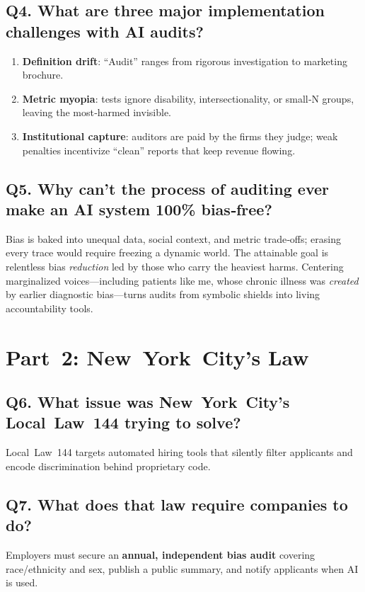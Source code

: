 \documentclass[12pt,twoside]{article}
\begin{document}
\subsection*{\textbf{Q4.} What are three major implementation challenges with AI audits?}
\begin{enumerate}[noitemsep]
\item \textbf{Definition drift}: “Audit” ranges from rigorous investigation to marketing brochure.%
\item \textbf{Metric myopia}: tests ignore disability, intersectionality, or small‑N groups, leaving the most‑harmed invisible.%
\item \textbf{Institutional capture}: auditors are paid by the firms they judge; weak penalties incentivize ``clean'' reports that keep revenue flowing.%
\end{enumerate}

\subsection*{\textbf{Q5.} Why can’t the process of auditing ever make an AI system 100\% bias‑free?}
Bias is baked into unequal data, social context, and metric trade‑offs; erasing every trace would require freezing a dynamic world. The attainable goal is relentless bias \textit{reduction} led by those who carry the heaviest harms. Centering marginalized voices—including patients like me, whose chronic illness was \emph{created} by earlier diagnostic bias—turns audits from symbolic shields into living accountability tools.

\section{Part 2: New York City’s Law}

\subsection*{\textbf{Q6.} What issue was New York City’s Local Law 144 trying to solve?}
Local Law 144 targets automated hiring tools that silently filter applicants and encode discrimination behind proprietary code.

\subsection*{\textbf{Q7.} What does that law require companies to do?}
Employers must secure an \textbf{annual, independent bias audit} covering race/ethnicity and sex, publish a public summary, and notify applicants when AI is used.
\end{document}

